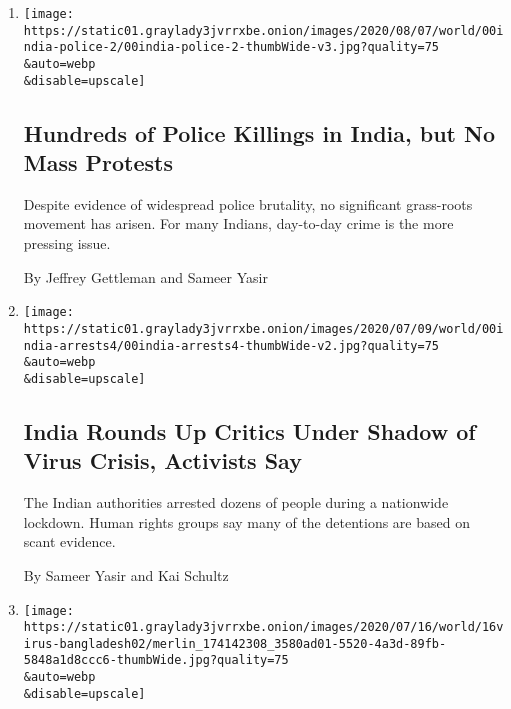 \begin{enumerate}
\def\labelenumi{\arabic{enumi}.}
\item
  \href{/2020/08/20/world/asia/india-police-brutality.html}{}

  \texttt{[image: https://static01.graylady3jvrrxbe.onion/images/2020/08/07/world/00india-police-2/00india-police-2-thumbWide-v3.jpg?quality=75\\\&auto=webp\\\&disable=upscale]}

  \hypertarget{hundreds-of-police-killings-in-india-but-no-mass-protests}{%
  \subsection{Hundreds of Police Killings in India, but No Mass
  Protests}\label{hundreds-of-police-killings-in-india-but-no-mass-protests}}

  Despite evidence of widespread police brutality, no significant
  grass-roots movement has arisen. For many Indians, day-to-day crime is
  the more pressing issue.

  By Jeffrey Gettleman and Sameer Yasir
\item
  \href{/2020/07/19/world/asia/india-activists-arrests-riots-coronavirus.html}{}

  \texttt{[image: https://static01.graylady3jvrrxbe.onion/images/2020/07/09/world/00india-arrests4/00india-arrests4-thumbWide-v2.jpg?quality=75\\\&auto=webp\\\&disable=upscale]}

  \hypertarget{india-rounds-up-critics-under-shadow-of-virus-crisis-activists-say}{%
  \subsection{India Rounds Up Critics Under Shadow of Virus Crisis,
  Activists
  Say}\label{india-rounds-up-critics-under-shadow-of-virus-crisis-activists-say}}

  The Indian authorities arrested dozens of people during a nationwide
  lockdown. Human rights groups say many of the detentions are based on
  scant evidence.

  By Sameer Yasir and Kai Schultz
\item
  \href{/2020/07/16/world/asia/coronavirus-bangladesh-italy-certificates.html}{}

  \texttt{[image: https://static01.graylady3jvrrxbe.onion/images/2020/07/16/world/16virus-bangladesh02/merlin\_174142308\_3580ad01-5520-4a3d-89fb-5848a1d8ccc6-thumbWide.jpg?quality=75\\\&auto=webp\\\&disable=upscale]}


\end{enumerate}
